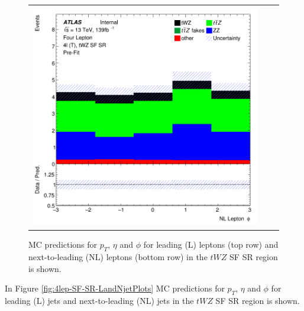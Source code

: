 \begin{figure}[htbp]
\begin{tabular}{ccc}
    \includegraphics[width=.3\textwidth]{figures/PreFitPlots/lep4_tWZ_4T_SF_NL_lepton_phi.png} \\

  \end{tabular}
    \caption{MC predictions for $p_{T}$, $\eta$ and $\phi$ for leading (L) leptons (top row) and next-to-leading (NL) leptons (bottom row) in the $tWZ$ SF SR region  is shown.}
  \label{fig:4lep-SF-SR-leptonPlots}
\end{figure}

In Figure \ref{fig:4lep-SF-SR-LandNjetPlots} MC predictions for $p_{T}$, $\eta$ and $\phi$ for leading (L) jets and next-to-leading (NL) jets in the $tWZ$ SF SR region is shown.


